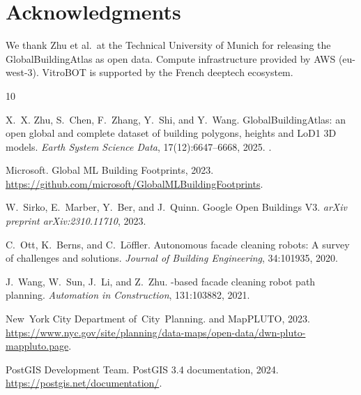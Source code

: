 \documentclass[10pt,twocolumn]{article}
\begin{document}
\section*{Acknowledgments}

We thank Zhu et al.\ at the Technical University of Munich for releasing the GlobalBuildingAtlas as open data. Compute infrastructure provided by AWS (eu-west-3). VitroBOT is supported by the French deeptech ecosystem.



\begin{thebibliography}{10}

X.~X. Zhu, S.~Chen, F.~Zhang, Y.~Shi, and Y.~Wang.
\newblock GlobalBuildingAtlas: an open global and complete dataset of building
  polygons, heights and LoD1 3D models.
\newblock \emph{Earth System Science Data}, 17(12):6647--6668, 2025.
\newblock {}.

Microsoft.
\newblock Global {ML} Building Footprints, 2023.
\newblock \url{https://github.com/microsoft/GlobalMLBuildingFootprints}.

W.~Sirko, E.~Marber, Y.~Ber, and J.~Quinn.
\newblock Google Open Buildings V3.
\newblock \emph{arXiv preprint arXiv:2310.11710}, 2023.

C.~Ott, K.~Berns, and C.~L\"offler.
\newblock Autonomous facade cleaning robots: A survey of challenges and
  solutions.
\newblock \emph{Journal of Building Engineering}, 34:101935, 2020.

J.~Wang, W.~Sun, J.~Li, and Z.~Zhu.
-based facade cleaning robot path planning.
\newblock \emph{Automation in Construction}, 131:103882, 2021.

New~York City Department of~City~Planning.
 and {MapPLUTO}, 2023.
\newblock \url{https://www.nyc.gov/site/planning/data-maps/open-data/dwn-pluto-mappluto.page}.

PostGIS Development Team.
\newblock PostGIS 3.4 documentation, 2024.
\newblock \url{https://postgis.net/documentation/}.

\end{thebibliography}
\end{document}
